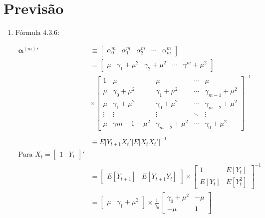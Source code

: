 \chapter{Previsão}

\begin{enumerate}
	\item[\fbox{4.1}]
	
	Fórmula 4.3.6: 
	
	\begin{align*}
		\boldsymbol{\alpha}^{(m)}{'}&\equiv
		\begin{bmatrix}
\alpha_0^{m}&\alpha_1^m&\alpha_2^m&\cdots&\alpha_m^m
		\end{bmatrix}\\
		&=\begin{bmatrix}
		\mu&\gamma_1+\mu^2&\gamma_2+\mu^2&\cdots&\gamma^m+\mu^2
		\end{bmatrix}\\
		&\times\begin{bmatrix}
		1&\mu&\mu&\cdots&\mu\\[0.3cm]
		\mu&\gamma_0+\mu^2&\gamma_1+\mu^2&\cdots&\gamma_{m-1}+\mu^2\\[0.3cm]
		\mu&\gamma_1+\mu^2&\gamma_0+\mu^2&\cdots&\gamma_{m-2}+\mu^2\\[0.3cm]
		\vdots&\vdots&\vdots&\ddots&\vdots\\[0.3cm]
		\mu&\gamma{m-1}+\mu^2&\gamma_{m-2}+\mu^2&\cdots&\gamma_0+\mu^2
		\end{bmatrix}^{-1}\\
		\\
		&\equiv  {E}\big[Y_{t+1}X_t'\big] {E}\big[X_tX_t'\big]^{-1}\\
		\text{Para }X_t=\begin{bmatrix}
		1&Y_t
		\end{bmatrix}'\\
		&=\begin{bmatrix}
		 {E}[Y_{t+1}]&
		 {E}[Y_{t+1}Y_t]
		\end{bmatrix}
		\times
		\begin{bmatrix}
		1&E[Y_{t}]\\[0.3cm]
		E[Y_{t}]&E[Y_{t}^2]
		\end{bmatrix}^{-1}\\
		&=\begin{bmatrix}
		\mu&
		\gamma_1+\mu^2
		\end{bmatrix}
		\times
		\frac{1}{\gamma_0}
		\begin{bmatrix}
		\gamma_0+\mu^2&-\mu\\
		-\mu&1

\end{bmatrix}
\end{align*}
\end{enumerate}
